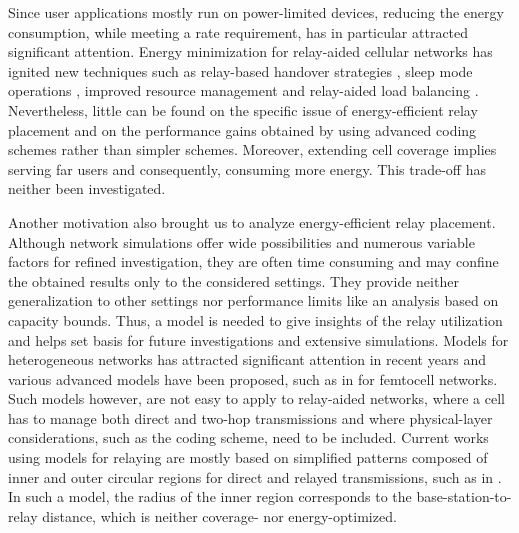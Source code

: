 \documentclass[journal]{IEEEtran}
\theoremstyle{definition}
\begin{document}
Since user applications mostly run on power-limited devices, reducing the energy consumption, while meeting a rate requirement, has in particular attracted significant attention. Energy minimization for relay-aided cellular networks has ignited new techniques such as relay-based handover strategies \cite{cho2009,yang2009HO}, sleep mode operations \cite{wang2010sleep}, improved resource management \cite{salem2010} and relay-aided load balancing \cite{load_balancing}.
Nevertheless, little can be found on the specific issue of energy-efficient relay placement and on the performance gains obtained by using advanced coding schemes rather than simpler schemes. 
Moreover,
extending cell coverage implies serving far users and consequently, consuming more energy.
This trade-off has neither been investigated.


Another motivation also brought us to analyze energy-efficient relay placement. Although network simulations offer wide possibilities and numerous variable factors for refined investigation, they are often time consuming and may confine the obtained results only to the considered settings. They provide
neither generalization to other settings nor performance limits like an analysis based on capacity bounds.  Thus, a model is needed to give insights of the relay utilization and helps set basis for future investigations and extensive simulations.
Models for heterogeneous networks has attracted significant attention in recent years and various advanced models have been proposed, such as in \cite{Dhillon2012} for femtocell networks. Such models however, are not easy to apply to relay-aided networks, where a cell has to manage both direct and two-hop transmissions and where physical-layer considerations, such as the coding scheme, need to be included.
Current works using models for relaying are mostly based on simplified patterns composed of inner and outer circular regions for direct and relayed transmissions, such as in \cite{Chandwani2010, Schober2011}. In such a model, the radius of the inner region corresponds to the base-station-to-relay distance, which is neither coverage- nor energy-optimized.
\end{document}
